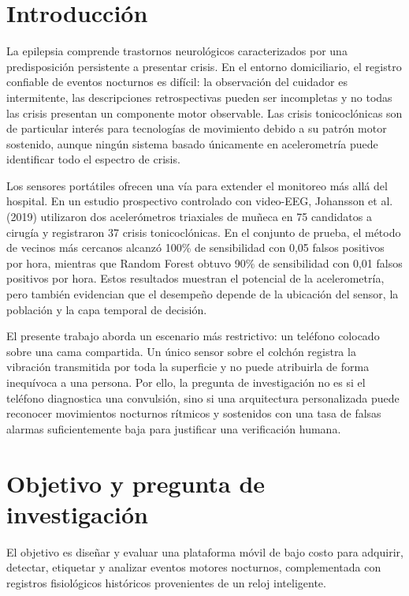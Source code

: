 \documentclass[12pt]{article}
\begin{document}
\section{Introducción}

La epilepsia comprende trastornos neurológicos caracterizados por una predisposición persistente a presentar crisis. En el entorno domiciliario, el registro confiable de eventos nocturnos es difícil: la observación del cuidador es intermitente, las descripciones retrospectivas pueden ser incompletas y no todas las crisis presentan un componente motor observable. Las crisis tonicoclónicas son de particular interés para tecnologías de movimiento debido a su patrón motor sostenido, aunque ningún sistema basado únicamente en acelerometría puede identificar todo el espectro de crisis.

Los sensores portátiles ofrecen una vía para extender el monitoreo más allá del hospital. En un estudio prospectivo controlado con video-EEG, Johansson et al. (2019) utilizaron dos acelerómetros triaxiales de muñeca en 75 candidatos a cirugía y registraron 37 crisis tonicoclónicas. En el conjunto de prueba, el método de vecinos más cercanos alcanzó 100\% de sensibilidad con 0,05 falsos positivos por hora, mientras que Random Forest obtuvo 90\% de sensibilidad con 0,01 falsos positivos por hora. Estos resultados muestran el potencial de la acelerometría, pero también evidencian que el desempeño depende de la ubicación del sensor, la población y la capa temporal de decisión.

El presente trabajo aborda un escenario más restrictivo: un teléfono colocado sobre una cama compartida. Un único sensor sobre el colchón registra la vibración transmitida por toda la superficie y no puede atribuirla de forma inequívoca a una persona. Por ello, la pregunta de investigación no es si el teléfono diagnostica una convulsión, sino si una arquitectura personalizada puede reconocer movimientos nocturnos rítmicos y sostenidos con una tasa de falsas alarmas suficientemente baja para justificar una verificación humana.

\section{Objetivo y pregunta de investigación}

El objetivo es diseñar y evaluar una plataforma móvil de bajo costo para adquirir, detectar, etiquetar y analizar eventos motores nocturnos, complementada con registros fisiológicos históricos provenientes de un reloj inteligente.
\end{document}
